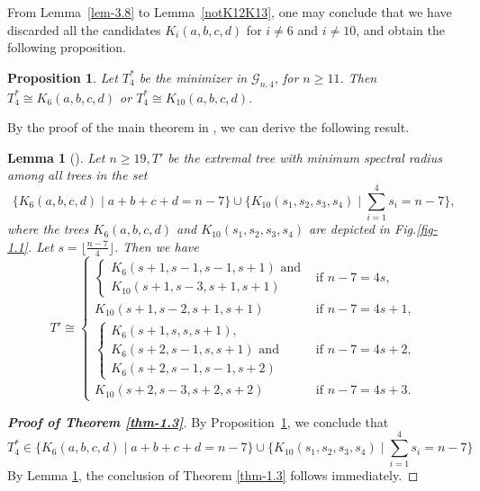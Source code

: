 \documentclass[12pt]{amsart}
\newtheorem{lem}{Lemma}[section]
\newtheorem{pro}{Proposition}[section]
\begin{document}
From Lemma~\ref{lem-3.8} to Lemma~\ref{notK12K13}, one may conclude that we have discarded all the candidates $K_i(a,b,c,d)$ for $i \ne 6$ and $i \ne 10$, and obtain the following proposition.

\begin{pro}\label{prop:remainsK6K10} Let  $T_4^* $ be the minimizer in $\mathcal{G}_{n,4} $, for $n\geq 11$. Then $T_4^*\cong K_6(a,b,c,d)$ or $T_4^*\cong K_{10}(a,b,c,d)$.
\end{pro}

\color{black}

By the proof of the main theorem in \cite{LouGuo2022}, we can derive the following result.
\begin{lem}[\cite{LouGuo2022}]\label{lem-3.6}
Let \( n \geq 19, T' \) be the extremal tree with minimum spectral radius among all trees in the set
\[
\Big\{ K_6(a,b,c,d) \;|\;  a+b+c+d = n-7 \Big\}
\cup
\Big\{ K_{10}(s_1,s_2,s_3,s_4) \;|\; \textstyle\sum_{i=1}^4 s_i = n-7 \Big\},
\]
where the trees \( K_6(a,b,c,d) \) and \( K_{10}(s_1,s_2,s_3,s_4) \) are depicted in Fig.\ref{fig-1.1}.
Let \( s = \lfloor \frac{n-7}{4} \rfloor \). Then we have
\[
	T' \cong 
	\begin{cases} 
		\begin{cases} K_6(s + 1, s - 1, s - 1, s + 1) \text{ and} \\ K_{10}(s + 1, s - 3, s + 1, s + 1) \end{cases} & \text{if } n - 7 = 4s, \\
		K_{10}(s + 1, s - 2, s + 1, s + 1) & \text{if } n - 7 = 4s + 1, \\
		\begin{cases} K_6(s + 1, s, s, s + 1), \\ K_6(s + 2, s - 1, s, s + 1) \text{ and} \\ K_6(s + 2, s - 1, s - 1, s + 2) \end{cases} & \text{if } n - 7 = 4s + 2, \\
		K_{10}(s + 2, s - 3, s + 2, s + 2) & \text{if } n - 7 = 4s + 3.
	\end{cases}
	\]	
\end{lem}



\begin{proof}[\bf{Proof of Theorem \ref{thm-1.3}}]
By Proposition~\ref{prop:remainsK6K10},  we conclude that 
\[
T_4^*\in \Big\{ K_6(a,b,c,d) \;|\;  a+b+c+d = n-7 \Big\}
\cup
\Big\{ K_{10}(s_1,s_2,s_3,s_4) \;|\; \textstyle\sum_{i=1}^4 s_i = n-7 \Big\}
\]
By Lemma \ref{lem-3.6}, the conclusion of Theorem \ref{thm-1.3} follows immediately.
\end{proof}
\end{document}
